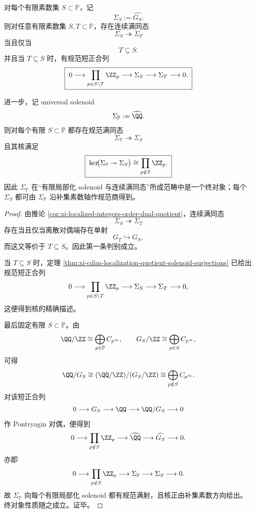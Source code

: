 \begin{theorem}\label{thm:xi-localized-solenoid-terminal-object-poset}
对每个有限素数集 \(S\subset\mathbb P\)，记
\[
\Sigma_S:=\widehat{G_S}.
\]
则对任意有限素数集 \(S,T\subset\mathbb P\)，存在连续满同态
\[
\Sigma_S\twoheadrightarrow \Sigma_T
\]
当且仅当
\[
\boxed{\;T\subseteq S.\;}
\]
并且当 \(T\subseteq S\) 时，有规范短正合列
\[
\boxed{\;
0\longrightarrow \prod_{p\in S\setminus T}\ZZ_p
\longrightarrow \Sigma_S
\longrightarrow \Sigma_T
\longrightarrow 0.\;}
\]

进一步，记 universal solenoid
\[
\Sigma_{\mathbb P}:=\widehat{\QQ}.
\]
则对每个有限 \(S\subset\mathbb P\) 都存在规范满同态
\[
\Sigma_{\mathbb P}\twoheadrightarrow \Sigma_S
\]
且其核满足
\[
\boxed{\;
\ker\!\bigl(\Sigma_{\mathbb P}\twoheadrightarrow \Sigma_S\bigr)
\cong
\prod_{p\notin S}\ZZ_p.\;}
\]
因此 \(\Sigma_{\mathbb P}\) 在“有限局部化 solenoid 与连续满同态”所成范畴中是一个终对象；每个 \(\Sigma_S\) 都可由 \(\Sigma_{\mathbb P}\) 沿补集素数轴作规范商得到。
\end{theorem}
\begin{proof}
由推论 \ref{cor:xi-localized-integers-order-dual-quotient}，连续满同态
\[
\Sigma_S\twoheadrightarrow \Sigma_T
\]
存在当且仅当离散对偶端存在单射
\[
G_T\hookrightarrow G_S,
\]
而这又等价于 \(T\subseteq S\)。因此第一条判别成立。

当 \(T\subseteq S\) 时，定理 \ref{thm:xi-cdim-localization-quotient-solenoid-surjections} 已给出规范短正合列
\[
0\longrightarrow \prod_{p\in S\setminus T}\ZZ_p
\longrightarrow \Sigma_S
\longrightarrow \Sigma_T
\longrightarrow 0,
\]
这便得到核的精确描述。

最后固定有限 \(S\subset\mathbb P\)。由
\[
\QQ/\ZZ\cong \bigoplus_{p\in\mathbb P}C_{p^\infty},
\qquad
G_S/\ZZ\cong \bigoplus_{p\in S}C_{p^\infty},
\]
可得
\[
\QQ/G_S
\cong
(\QQ/\ZZ)/(G_S/\ZZ)
\cong
\bigoplus_{p\notin S}C_{p^\infty}.
\]
对该短正合列
\[
0\longrightarrow G_S\longrightarrow \QQ\longrightarrow \QQ/G_S\longrightarrow 0
\]
作 Pontryagin 对偶，便得到
\[
0\longrightarrow \prod_{p\notin S}\ZZ_p
\longrightarrow \widehat{\QQ}
\longrightarrow \widehat{G_S}
\longrightarrow 0.
\]
亦即
\[
0\longrightarrow \prod_{p\notin S}\ZZ_p
\longrightarrow \Sigma_{\mathbb P}
\longrightarrow \Sigma_S
\longrightarrow 0.
\]
故 \(\Sigma_{\mathbb P}\) 向每个有限局部化 solenoid 都有规范满射，且核正由补集素数方向给出。终对象性质随之成立。证毕。
\end{proof}
